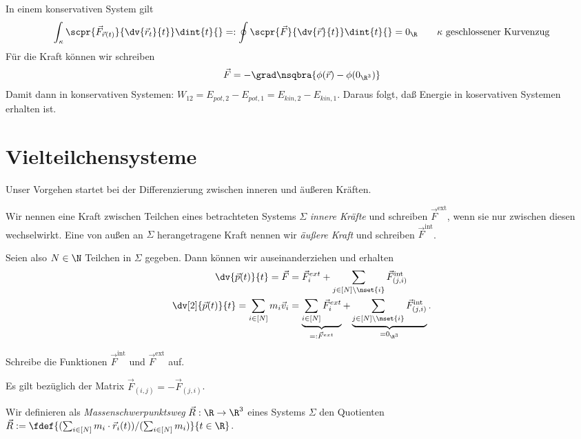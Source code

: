 \documentclass[../main.tex]{subfiles}
\begin{document}
		 In einem konservativen System gilt
		 \begin{align*}
		 	\int_{\kappa}\scpr{\vec{F}_{\vec{r}(t)}}{\dv{\vec{r}_t}{t}}\dint{t}{}=:\oint \scpr{\vec{F}}{\dv{\vec r}{t}}\dint{t}{}=0_\R \qquad\kappa\text{ geschlossener Kurvenzug}
		 \end{align*}
		  Für die Kraft können wir schreiben
		 \begin{align*}
		 	\vec{F}=-\grad\nsqbra{\phi(\vec{r})-\phi(0_{\R^3})}
		 \end{align*}
		 Damit dann in konservativen Systemen: $W_{12}=E_{pot,2}-E_{pot,1}=E_{kin,2}-E_{kin,1}$. Daraus folgt, daß Energie in koservativen Systemen erhalten ist. 
		 
	\section{Vielteilchensysteme}
		Unser Vorgehen startet bei der Differenzierung zwischen inneren und äußeren Kräften. 
		\begin{info}
			Wir nennen eine Kraft zwischen Teilchen eines betrachteten Systems $\Sigma$ \emph{innere Kräfte} und schreiben $\vec F^{\text{ext}}$, wenn sie nur zwischen diesen wechselwirkt. Eine von außen an $\Sigma$ herangetragene Kraft nennen wir \emph{äußere Kraft} und schreiben $\vec F^{\text{int}}$.
		\end{info}
		\noindent Seien also $N\in\N$ Teilchen in $\Sigma$ gegeben. Dann können wir auseinanderziehen und erhalten 
		\begin{align*}
			\dv{\vec p(t)}{t}=\vec{F}&=\vec{F}_i^{ext}+\sum_{j\in[N]\setminus\nset{i}}\vec{F}^{\text{int}}_{(j,i)} \\
			\dv[2]{\vec p(t)}{t}=\sum_{i\in[N]}m_i\vec{v}_i&=\underbrace{\sum_{i\in[N]}\vec{F}_i^{ext}}_{=:\vec{F}^{ext}}+\underbrace{\sum_{j\in[N]\setminus\nset{i}}\vec{F}^{\text{int}}_{(j,i)}}_{=0_{\R^3}}.
		\end{align*}
		\begin{Aufgabe}
			\nr Schreibe die Funktionen $\vec F^{\text{int}}$ und $\vec F^{\text{ext}}$ auf. 
		\end{Aufgabe}
		\noindent Es gilt bezüglich der Matrix $\vec{F}_{(i,j)}=-\vec{F}_{(j,i)}$. 
		\begin{info}
			Wir definieren als \emph{Massenschwerpunktsweg} $\vec R:\R\to\R^3$ eines Systems $\Sigma$ den Quotienten $\vec R:=\fdef{(\sum_{i\in[N]}m_i\cdot\vec{r}_i(t))/(\sum_{i\in[N]}m_i)}{t\in\R}$. 
		\end{info}
\end{document}
